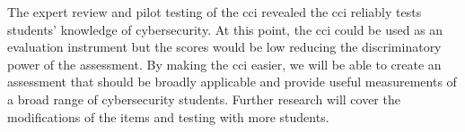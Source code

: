 


The expert review and pilot testing of the \gls{cci} revealed the \gls{cci} reliably tests students' knowledge of cybersecurity. At this point, the \gls{cci} could be used as an evaluation instrument but the scores would be low reducing the discriminatory power of the assessment. By making the \gls{cci} easier, we will be able to create an assessment that should be broadly applicable and provide useful measurements of a broad range of cybersecurity students. Further research will cover the modifications of the items and testing with more students. 